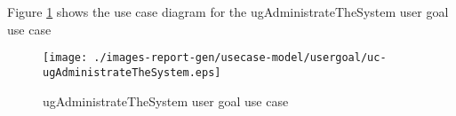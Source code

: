 Figure \ref{fig:lu.uni.lassy.icrash.spec.messir.reference-RE-UCD-uc-ugAdministrateTheSystem}
shows the use case diagram for the ugAdministrateTheSystem user goal use case

\begin{figure}[htbp]
\begin{center}

\texttt{[image: ./images-report-gen/usecase-model/usergoal/uc-ugAdministrateTheSystem.eps]}
\end{center}
\caption[lu.uni.lassy.icrash.spec.messir.reference Use Case Diagram: uc-ugAdministrateTheSystem]{ ugAdministrateTheSystem user goal use case}
\label{fig:lu.uni.lassy.icrash.spec.messir.reference-RE-UCD-uc-ugAdministrateTheSystem}
\end{figure}
\vspace{0.5cm}
